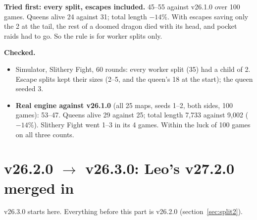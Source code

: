 \documentclass[11pt,a4paper]{article}
\begin{document}
\textbf{Tried first: every split, escapes included.} 45--55 against v26.1.0 over 100 games. Queens alive 24 against 31;
total length $-14\%$. With escapes saving only the 2 at the tail, the rest of a doomed dragon died with its head, and
pocket raids had to go. So the rule is for worker splits only.

\textbf{Checked.}
\begin{itemize}
      \item Simulator, Slithery Fight, 60 rounds: every worker split (35) had a child of 2. Escape splits kept their sizes
            (2--5, and the queen's 18 at the start); the queen seeded 3.
      \item \textbf{Real engine against v26.1.0} (all 25 maps, seeds 1--2, both sides, 100 games): 53--47. Queens alive 29
            against 25; total length 7,733 against 9,002 ($-14\%$). Slithery Fight went 1--3 in its 4 games. Within the luck
            of 100 games on all three counts.
\end{itemize}

\part{v26.2.0 $\rightarrow$ v26.3.0: Leo's v27.2.0 merged in}
v26.3.0 starts here. Everything before this part is v26.2.0 (section~\ref{sec:split2}).
\end{document}
